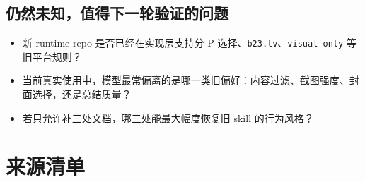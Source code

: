 \documentclass[a4paper]{article}
\begin{document}
\subsection{仍然未知，值得下一轮验证的问题}

\begin{itemize}
\item 新 runtime repo 是否已经在实现层支持分 P 选择、\texttt{b23.tv}、\texttt{visual-only} 等旧平台规则？
\item 当前真实使用中，模型最常偏离的是哪一类旧偏好：内容过滤、截图强度、封面选择，还是总结质量？
\item 若只允许补三处文档，哪三处能最大幅度恢复旧 skill 的行为风格？
\end{itemize}

\appendix

\section{来源清单}
\end{document}
